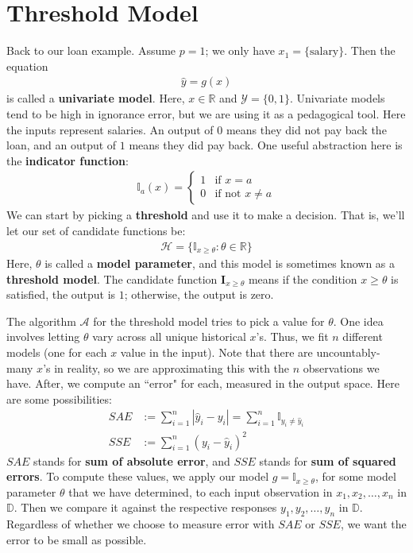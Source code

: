 \documentclass[12pt, a4paper]{article}
\begin{document}
	\section*{Threshold Model}
	Back to our loan example. Assume $p = 1$; we only have $x_1=\{\text{salary}\}$.
	Then the equation
	\begin{align*}
		\hat{y}=g(x)
	\end{align*}
	is called a \textbf{univariate model}. Here, $x\in \mathbb{R}$
	and $\mathcal{Y} = \{0, 1\}$. Univariate models tend to be high in ignorance error,
	but we are using it as a pedagogical tool. Here the inputs represent salaries. An
	output of $0$ means they did not pay back the loan, and an output of $1$ means they did pay back.
	One useful abstraction here is the \textbf{indicator function}:
	\begin{align*}
		\mathbb{I}_a(x) = \begin{cases}
			1 & \text{if } x=a\\
			0 & \text{if not } x\neq a
		\end{cases}
	\end{align*}
	We can start by picking a \textbf{threshold} and use it to make a decision. That is,
	we'll let our set of candidate functions be:
	\begin{align*}
		\mathcal{H} = \{\mathbb{I}_{x\geq \theta}: \theta\in\mathbb{R}\}
	\end{align*}
	Here, $\theta$ is called a \textbf{model parameter}, and this model is sometimes known
	as a \textbf{threshold model}. The candidate function $\mathbf{I}_{x\geq \theta}$ means
	if the condition $x\geq \theta$ is satisfied, the output is $1$; otherwise, the output
	is zero.
	
	The algorithm $\mathcal{A}$ for the threshold model tries to pick a value for $\theta$. One idea
	involves letting $\theta$ vary across all unique historical $x$'s. Thus, we fit $n$ different
	models (one for each $x$ value in the input). Note that there are uncountably-many $x$'s in reality,
	so we are approximating this with the $n$ observations we have.
	After, we compute an ``error" for each, measured in the output space. Here are some possibilities:
	\begin{align*}
		SAE &:= \sum_{i=1}^{n}|\hat{y}_i-y_i|=\sum_{i=1}^{n}\mathbb{I}_{y_i\neq \hat{y}_i}\\
		SSE &:= \sum_{i=1}^{n}(y_i-\hat{y}_i)^2
	\end{align*}
	$SAE$ stands for \textbf{sum of absolute error}, and $SSE$ stands for \textbf{sum of squared errors}.
	To compute these values, we apply our model $g=\mathbb{I}_{x\geq \theta}$, for some model
	parameter $\theta$ that we have determined, to each input observation in $x_1,x_2,\ldots,x_n$
	in $\mathbb{D}$. Then we compare it against the respective responses $y_1,y_2,\ldots,y_n$
	in $\mathbb{D}$. Regardless of whether we choose to measure error with $SAE$ or $SSE$,
	we want the error to be small as possible.
	\pagebreak
	\printbibliography
\end{document}
